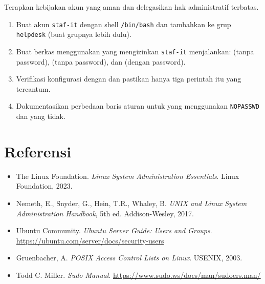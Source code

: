 \begin{exercisebox}
Terapkan kebijakan akun yang aman dan delegasikan hak administratif terbatas.
\begin{enumerate}
    \item Buat akun \texttt{staf-it} dengan shell \texttt{/bin/bash} dan tambahkan ke grup \texttt{helpdesk} (buat grupnya lebih dulu).
    \item Buat berkas  menggunakan  yang mengizinkan \texttt{staf-it} menjalankan:  (tanpa password),  (tanpa password), dan  (dengan password).
    \item Verifikasi konfigurasi dengan  dan pastikan hanya tiga perintah itu yang tercantum.
    \item Dokumentasikan perbedaan baris aturan untuk yang menggunakan \texttt{NOPASSWD} dan yang tidak.
\end{enumerate}
\end{exercisebox}

\section{Referensi}
\label{sec:file-user-references}

\begin{itemize}
    \item The Linux Foundation. \textit{Linux System Administration Essentials}. Linux Foundation, 2023.
    \item Nemeth, E., Snyder, G., Hein, T.R., Whaley, B. \textit{UNIX and Linux System Administration Handbook}, 5th ed. Addison-Wesley, 2017.
    \item Ubuntu Community. \textit{Ubuntu Server Guide: Users and Groups}. \url{https://ubuntu.com/server/docs/security-users}
    \item Gruenbacher, A. \textit{POSIX Access Control Lists on Linux}. USENIX, 2003.
    \item Todd C. Miller. \textit{Sudo Manual}. \url{https://www.sudo.ws/docs/man/sudoers.man/}
\end{itemize}
